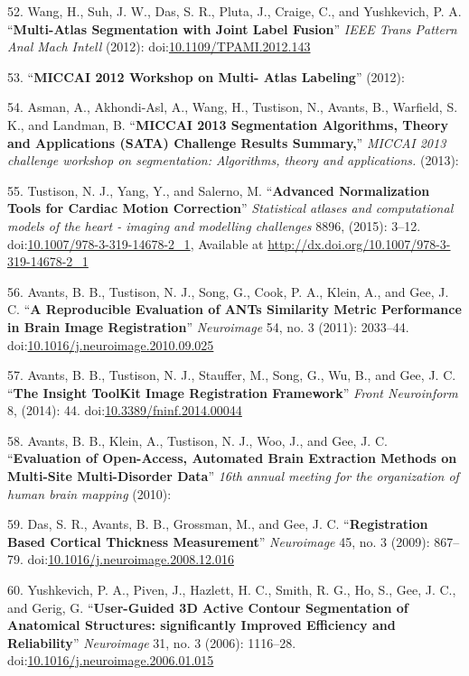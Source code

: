 \documentclass[11pt,]{article}
\begin{document}
52. Wang, H., Suh, J. W., Das, S. R., Pluta, J., Craige, C., and
Yushkevich, P. A. ``\textbf{Multi-Atlas Segmentation with Joint Label
Fusion}'' \emph{IEEE Trans Pattern Anal Mach Intell} (2012):
doi:\href{http://dx.doi.org/10.1109/TPAMI.2012.143}{10.1109/TPAMI.2012.143}

53. ``\textbf{MICCAI 2012 Workshop on Multi- Atlas Labeling}'' (2012):

54. Asman, A., Akhondi-Asl, A., Wang, H., Tustison, N., Avants, B.,
Warfield, S. K., and Landman, B. ``\textbf{MICCAI 2013 Segmentation
Algorithms, Theory and Applications (SATA) Challenge Results Summary,}''
\emph{MICCAI 2013 challenge workshop on segmentation: Algorithms, theory
and applications.} (2013):

55. Tustison, N. J., Yang, Y., and Salerno, M. ``\textbf{Advanced
Normalization Tools for Cardiac Motion Correction}'' \emph{Statistical
atlases and computational models of the heart - imaging and modelling
challenges} 8896, (2015): 3--12.
doi:\href{http://dx.doi.org/10.1007/978-3-319-14678-2_1}{10.1007/978-3-319-14678-2\_1},
Available at \url{http://dx.doi.org/10.1007/978-3-319-14678-2_1}

56. Avants, B. B., Tustison, N. J., Song, G., Cook, P. A., Klein, A.,
and Gee, J. C. ``\textbf{A Reproducible Evaluation of ANTs Similarity
Metric Performance in Brain Image Registration}'' \emph{Neuroimage} 54,
no. 3 (2011): 2033--44.
doi:\href{http://dx.doi.org/10.1016/j.neuroimage.2010.09.025}{10.1016/j.neuroimage.2010.09.025}

57. Avants, B. B., Tustison, N. J., Stauffer, M., Song, G., Wu, B., and
Gee, J. C. ``\textbf{The Insight ToolKit Image Registration Framework}''
\emph{Front Neuroinform} 8, (2014): 44.
doi:\href{http://dx.doi.org/10.3389/fninf.2014.00044}{10.3389/fninf.2014.00044}

58. Avants, B. B., Klein, A., Tustison, N. J., Woo, J., and Gee, J. C.
``\textbf{Evaluation of Open-Access, Automated Brain Extraction Methods
on Multi-Site Multi-Disorder Data}'' \emph{16th annual meeting for the
organization of human brain mapping} (2010):

59. Das, S. R., Avants, B. B., Grossman, M., and Gee, J. C.
``\textbf{Registration Based Cortical Thickness Measurement}''
\emph{Neuroimage} 45, no. 3 (2009): 867--79.
doi:\href{http://dx.doi.org/10.1016/j.neuroimage.2008.12.016}{10.1016/j.neuroimage.2008.12.016}

60. Yushkevich, P. A., Piven, J., Hazlett, H. C., Smith, R. G., Ho, S.,
Gee, J. C., and Gerig, G. ``\textbf{User-Guided 3D Active Contour
Segmentation of Anatomical Structures: significantly Improved Efficiency
and Reliability}'' \emph{Neuroimage} 31, no. 3 (2006): 1116--28.
doi:\href{http://dx.doi.org/10.1016/j.neuroimage.2006.01.015}{10.1016/j.neuroimage.2006.01.015}
\end{document}
